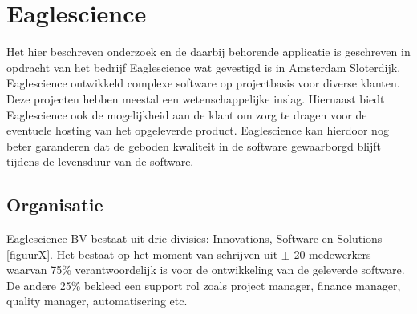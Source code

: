 \chapter{Eaglescience}\label{ch:eaglescience} %

\label{ch:Eaglescience} %


Het hier beschreven onderzoek en de daarbij behorende applicatie is geschreven in opdracht van het bedrijf Eaglescience wat gevestigd is in Amsterdam Sloterdijk.
Eaglescience ontwikkeld complexe software op projectbasis voor diverse klanten.
Deze projecten hebben meestal een wetenschappelijke inslag.
Hiernaast biedt Eaglescience ook de mogelijkheid aan de klant om zorg te dragen voor de eventuele hosting van het opgeleverde product.
Eaglescience kan hierdoor nog beter garanderen dat de geboden kwaliteit in de software gewaarborgd blijft tijdens de levensduur van de software.

\section{Organisatie}\label{sec:organisatie}

Eaglescience BV bestaat uit drie divisies: Innovations, Software en Solutions [figuurX].%
Het bestaat op het moment van schrijven uit $\pm$ 20 medewerkers waarvan 75\% verantwoordelijk is voor de ontwikkeling van de geleverde software.
De andere 25\% bekleed een support rol zoals project manager, finance manager, quality manager, automatisering etc. \\

